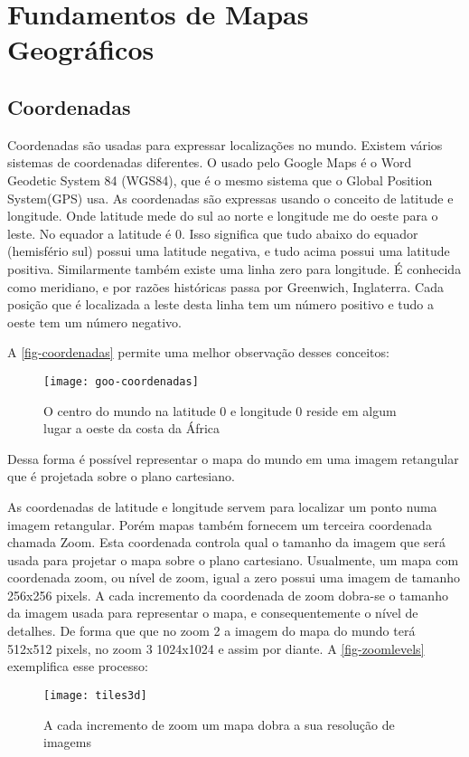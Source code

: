 \section{Fundamentos de Mapas Geográficos}
	
	\subsection{Coordenadas}
	Coordenadas são usadas para expressar localizações no mundo. Existem vários sistemas de coordenadas diferentes. O usado pelo Google Maps é o Word Geodetic System 84 (WGS84), que é o mesmo sistema que o Global Position System(GPS) usa. As coordenadas são expressas usando o conceito de latitude e longitude. Onde latitude mede do sul ao norte e longitude me do oeste para o leste. No equador a latitude é 0. Isso significa que tudo abaixo do equador (hemisfério sul) possui uma latitude negativa, e tudo acima possui uma latitude positiva. Similarmente também existe uma linha zero para longitude. É conhecida como meridiano, e por razões históricas passa por Greenwich, Inglaterra. Cada posição que é localizada a leste desta linha tem um número positivo e tudo a oeste tem um número negativo\cite[4]{livroGoogleApiV3}. 
	
	A \autoref{fig-coordenadas} permite uma melhor observação desses conceitos:
	\begin{figure}[htb]
	\caption{\label{fig-coordenadas} O centro do mundo na latitude 0 e longitude 0 reside em algum lugar a oeste da costa da África}
	\begin{center}
	    \texttt{[image: goo-coordenadas]}
	\end{center}
	\end{figure}
	
	
	Dessa forma é possível representar o mapa do mundo em uma imagem retangular que é projetada sobre o plano cartesiano.
	
	As coordenadas de latitude e longitude servem para localizar um ponto numa imagem retangular. Porém mapas também fornecem um terceira coordenada chamada Zoom. Esta  coordenada controla qual o tamanho da imagem que será usada para projetar o mapa sobre o plano cartesiano. Usualmente, um mapa com coordenada zoom, ou nível de zoom, igual a zero possui uma imagem de tamanho 256x256 pixels. A cada incremento da coordenada de zoom dobra-se o tamanho da imagem usada para representar o mapa, e consequentemente o nível de detalhes. De forma que que no zoom 2 a imagem do mapa do mundo terá 512x512 pixels, no zoom 3 1024x1024 e assim por diante. A \autoref{fig-zoomlevels} exemplifica esse processo:
	\begin{figure}[htb]
	\caption{\label{fig-zoomlevels} A cada incremento de zoom um mapa dobra a sua resolução de imagems}
	\begin{center}
	    \texttt{[image: tiles3d]}
	\end{center}
	\end{figure}

